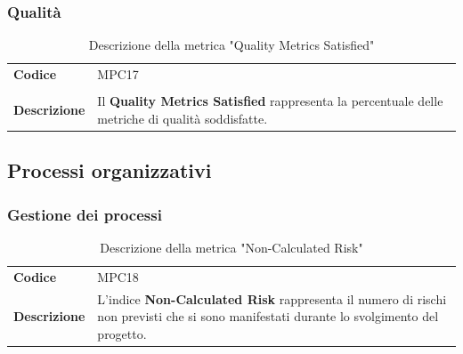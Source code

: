 \documentclass[a4paper,12pt]{article}
\begin{document}
        \subsubsection{Qualità}   
            {\renewcommand{\arraystretch}{1.4}
            \begin{table}[H]
            \centering
            \begin{tabularx}{\textwidth}{|l|X|}
                \hline
                \rowcolor{gold}
                \multicolumn{2}{|c|}{\textbf{Quality Metrics Satisfied}}\\
                \hline
                \textbf{Codice} & MPC17\\
                \hline
                \raisebox{0.6\height}{\textbf{Formula}} &  \rule{0pt}{5ex}\raisebox{0.3\height}{\( \displaystyle \text{Quality Metrics Satisfied} = \left(\frac{\text{Numero di metriche soddisfatte}}{\text{Numero di metriche totali}}\right)*100 \)}\\
                \hline
                \textbf{Descrizione} & Il \textbf{Quality Metrics Satisfied} rappresenta la percentuale delle metriche di qualità soddisfatte. \\
                \hline
            \end{tabularx}      
            \caption{Descrizione della metrica "Quality Metrics Satisfied"}
            \end{table}
            }
           
    \subsection{Processi organizzativi}

        \subsubsection{Gestione dei processi}
            {\renewcommand{\arraystretch}{1.4}
            \begin{table}[H]
            \centering
            \begin{tabularx}{\textwidth}{|l|X|}
                \hline
                \rowcolor{gold}
                \multicolumn{2}{|c|}{\textbf{Non-Calculated Risk}}\\
                \hline
                \textbf{Codice} & MPC18\\
                \hline
                \textbf{Descrizione} & L'indice \textbf{Non-Calculated Risk} rappresenta il numero di rischi non previsti che si sono manifestati durante lo svolgimento del progetto. \\
                \hline
            \end{tabularx}      
            \caption{Descrizione della metrica "Non-Calculated Risk"}
            \end{table}
            }
\end{document}
